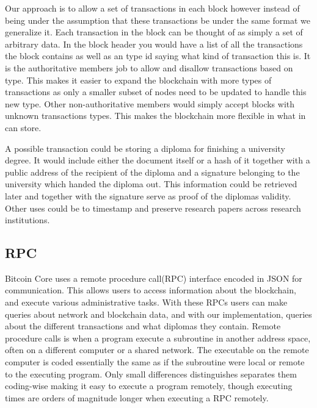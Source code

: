 \documentclass[11pt]{article}
\begin{document}
Our approach is to allow a set of transactions in each block however instead of being under the assumption that these transactions be under the same format we generalize it. Each transaction in the block can be thought of as simply a set of arbitrary data. In the block header you would have a list of all the transactions the block contains as well as an type id saying what kind of transaction this is. It is the authoritative members job to allow and disallow transactions based on type. This makes it easier to expand the blockchain with more types of transactions as only a smaller subset of nodes need to be updated to handle this new type. Other non-authoritative members would simply accept blocks with unknown transactions types. This makes the blockchain more flexible in what in can store.


A possible transaction could be storing a diploma for finishing a university degree. It would include either the document itself or a hash of it together with a public address of the recipient of the diploma and a signature belonging to the university which handed the diploma out. This information could be retrieved later and together with the signature serve as proof of the diplomas validity. Other uses could be to timestamp and preserve research papers across research institutions. 

\subsection{RPC}
Bitcoin Core uses a remote procedure call(RPC) interface encoded in JSON for communication. This allows users to access information about the blockchain, and execute various administrative tasks. With these RPCs users can make queries about network and blockchain data, and with our implementation, queries about the different transactions and what diplomas they contain. Remote procedure calls is when a program execute a subroutine in another address space, often on a different computer or a shared network. The executable on the remote computer is coded essentially the same as if the subroutine were local or remote to the executing program. Only small differences distinguishes separates them coding-wise making it easy to execute a program remotely, though executing times are orders of magnitude longer when executing a RPC remotely. 
\end{document}
